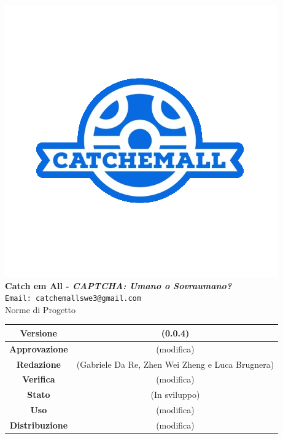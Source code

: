 \begin{titlepage}
\begin{center}
		\includegraphics[scale = 1.5]{img/logo.png}\\
		\bigskip
		\large \textbf{Catch em All - \textit{CAPTCHA: Umano o Sovraumano?}}\\
		\texttt{Email: catchemallswe3@gmail.com}\\
		\vfill
		{\fontsize{1.5cm}{0}\selectfont Norme di Progetto}\\
		\vfill
		\renewcommand\tabularxcolumn[1]{>{\Centering}m{#1}}
		\begin{tabularx}{\textwidth}{|c|c|}
			\hline
			\textbf{Versione}      & (0.0.4)                                          \\
			\hline
			\textbf{Approvazione}  & (modifica)                                       \\
			\hline
			\textbf{Redazione}     & (Gabriele Da Re, Zhen Wei Zheng e Luca Brugnera) \\
			\hline
			\textbf{Verifica}      & (modifica)                                       \\
			\hline
			\textbf{Stato}         & (In sviluppo)                                    \\
			\hline
			\textbf{Uso}           & (modifica)                                       \\
			\hline
			\textbf{Distribuzione} & (modifica)                                       \\
			\hline
		\end{tabularx}
	\end{center}
\end{titlepage}
